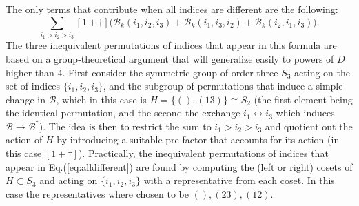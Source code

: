 \documentclass[12pt,a4paper]{article}
\begin{document}
The only terms that contribute when all indices are different are the following:
\begin{equation} \label{eq:alldifferent}
\sum_{i_1 > i_2 > i_3} [1+\dagger] \Big( \mathcal{B}_k(i_1, i_2, i_3) + \mathcal{B}_k(i_1, i_3, i_2) + \mathcal{B}_k(i_2, i_1, i_3) \Big).
\end{equation}
The three inequivalent permutations of indices that appear in this formula are based on a group-theoretical argument that will generalize easily to powers of $D$ higher than 4. First consider the symmetric group of order three $S_3$ acting on the set of indices $\{i_1, i_2, i_3\}$, and the subgroup of permutations that induce a simple change in $\mathcal{B}$, which in this case is $H = \{(), (13)\} \cong S_2$ (the first element being the identical permutation, and the second the exchange $i_1 \leftrightarrow i_3$ which induces $\mathcal{B} \rightarrow \mathcal{B}^\dagger$). The idea is then to restrict the sum to $i_1 > i_2 > i_3$ and quotient out the action of $H$ by introducing a suitable pre-factor that accounts for its action (in this case $[1+\dagger]$). Practically, the inequivalent permutations of indices that appear in Eq.(\ref{eq:alldifferent}) are found by computing the (left or right) cosets of $H \subset S_3$ and acting on $\{i_1, i_2, i_3\}$ with a representative from each coset. In this case the representatives where chosen to be $(), (23), (12)$.\newline
\end{document}
